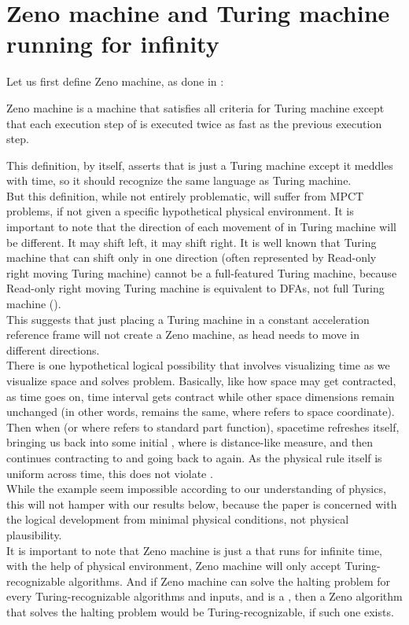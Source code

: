 \documentclass{roffin}
\begin{document}
\section{Zeno machine and Turing machine running for infinity}
Let us first define Zeno machine, as done in \cite{potgieter06}:
\begin{definition}
Zeno machine  is a machine that satisfies all criteria for Turing machine except that each execution step of  is executed twice as fast as the previous execution step.
\end{definition}
This definition, by itself, asserts that  is just a Turing machine except it meddles with time, so it should recognize the same language as Turing machine.\\
But this definition, while not entirely problematic, will suffer from MPCT problems, if not given a specific hypothetical physical environment. It is important to note that the direction of each movement of  in Turing machine will be different. It may shift left, it may shift right. It is well known that Turing machine that can shift only in one direction (often represented by Read-only right moving Turing machine) cannot be a full-featured Turing machine, because Read-only right moving Turing machine is equivalent to DFAs, not full Turing machine (\cite{tucker04}).\\
This suggests that just placing a Turing machine  in a constant acceleration reference frame will not create a Zeno machine, as head  needs to move in different directions. \\
There is one hypothetical logical possibility that involves visualizing time as we visualize space and solves  problem. Basically, like how space may get contracted, as time goes on, time interval  gets contract while other space dimensions remain unchanged (in other words,  remains the same, where  refers to space coordinate). Then when  (or  where  refers to standard part function), spacetime refreshes itself, bringing us back into some initial , where  is distance-like measure, and then continues contracting to  and going back to  again. As the physical rule itself is uniform across time, this does not violate .\\    
While the example seem impossible according to our understanding of physics, this will not hamper with our results below, because the paper is concerned with the logical development from minimal physical conditions, not physical plausibility.\\
It is important to note that Zeno machine is just a  that runs for infinite time, with the help of physical environment, Zeno machine will only accept Turing-recognizable algorithms. And if Zeno machine can solve the halting problem for every Turing-recognizable algorithms and inputs, and  is a , then a Zeno algorithm that solves the halting problem would be Turing-recognizable, if such one exists.\\
\end{document}
